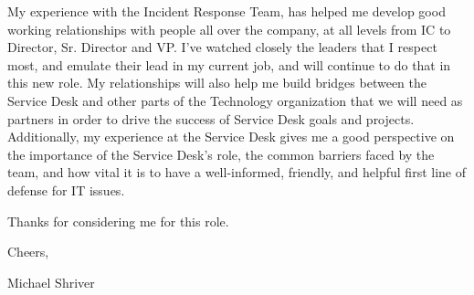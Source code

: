 \documentclass[10pt,oneside]{article}
\begin{document}
My experience with the Incident Response Team, has helped me develop good working relationships with people all over the company, at all levels from IC to Director, Sr. Director and VP. I've watched closely the leaders that I respect most, and emulate their lead in my current job, and will continue to do that in this new role. My relationships will also help me build bridges between the Service Desk and other parts of the Technology organization that we will need as partners in order to drive the success of Service Desk goals and projects. Additionally, my experience at the Service Desk gives me a good perspective on the importance of the Service Desk's role, the common barriers faced by the team, and how vital it is to have a well-informed, friendly, and helpful first line of defense for IT issues.

\vspace{\baselineskip}

Thanks for considering me for this role.

\vspace{\baselineskip}

Cheers,

\vspace{\baselineskip}

Michael Shriver
\end{document}
